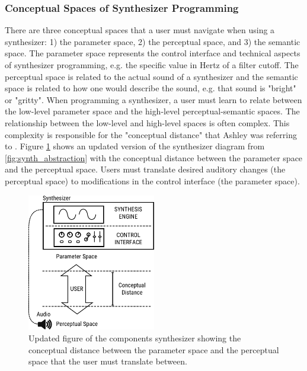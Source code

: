 \subsubsection{Conceptual Spaces of Synthesizer Programming}
There are three conceptual spaces that a user must navigate when using a synthesizer: 1) the parameter space, 2) the perceptual space, and 3) the semantic space. The parameter space represents the control interface and technical aspects of synthesizer programming, e.g. the specific value in Hertz of a filter cutoff. The perceptual space is related to the actual sound of a synthesizer and the semantic space is related to how one would describe the sound, e.g. that sound is "bright" or "gritty". When programming a synthesizer, a user must learn to relate between the low-level parameter space and the high-level perceptual-semantic spaces. The relationship between the low-level and high-level spaces is often complex. This complexity is responsible for the "conceptual distance" that Ashley was referring to \cite{ashley1986knowledge}. Figure \ref{fig:synth_conceptual_dist} shows an updated version of the synthesizer diagram from \ref{fig:synth_abstraction} with the conceptual distance between the parameter space and the perceptual space. Users must translate desired auditory changes (the perceptual space) to modifications in the control interface (the parameter space).

\begin{figure}[ht]
    \centering
    \includegraphics[width=0.5\textwidth]{figures/background/synth_conceptual_dist.png}
    \caption{Updated figure of the components synthesizer showing the conceptual distance between the parameter space and the perceptual space that the user must translate between.}
    \label{fig:synth_conceptual_dist}
\end{figure}

